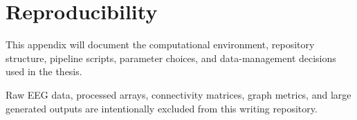 \chapter{Reproducibility}

This appendix will document the computational environment, repository structure, pipeline scripts, parameter choices, and data-management decisions used in the thesis.

Raw EEG data, processed arrays, connectivity matrices, graph metrics, and large generated outputs are intentionally excluded from this writing repository.

